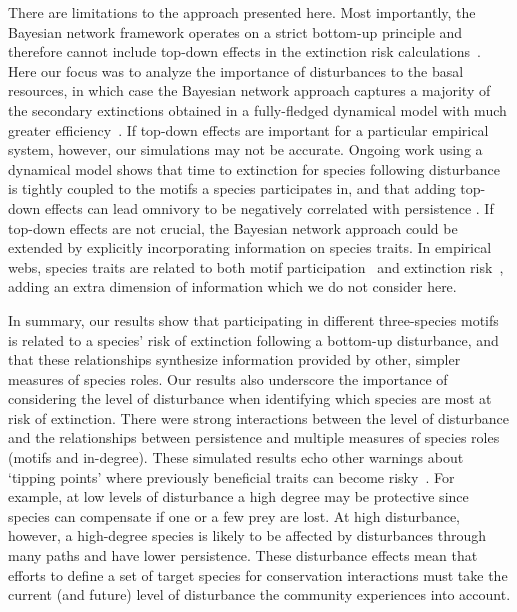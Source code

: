 \documentclass[12pt]{article}
\begin{document}
\begin{spacing}{2.0}
    
    There are limitations to the approach presented here.
    Most importantly, the Bayesian network framework operates on a  strict bottom-up principle and therefore cannot include top-down effects in the extinction risk calculations~\citep{Eklof2013}. 
    Here our focus was to analyze the importance of disturbances to the basal resources, in which case the Bayesian network approach captures a majority of the secondary extinctions obtained in a fully-fledged dynamical model with much greater efficiency~\citep{Eklof2013}.
    If top-down effects are important for a particular empirical system, however, our simulations may not be accurate. 
    Ongoing work using a dynamical model shows that time to extinction for species following disturbance is tightly coupled to the motifs a species participates in, and that adding top-down effects can lead omnivory to be negatively correlated with persistence \citep{Cirtwill2021_inprep}. 
    If top-down effects are not crucial, the Bayesian network approach could be extended by explicitly incorporating information on species traits.
    In empirical webs, species traits are related to both motif participation~\citep{cirtwill2018feeding} and extinction risk~\citep{Brose2017, curtsdotter2011robustness, Cardillo2005, Purvis2000},
    adding an extra dimension of information which we do not consider here.
    
    In summary, our results show that participating in different three-species motifs is related to a species' risk of extinction following a bottom-up disturbance, and that these relationships synthesize information provided by other, simpler measures of species roles.
    Our results also underscore the importance of considering the level of disturbance when identifying which species are most at risk of extinction.
    There were strong interactions between the level of disturbance and the relationships between persistence and multiple measures of species roles (motifs and in-degree).
    These simulated results echo other warnings about `tipping points' where previously beneficial traits can become risky~\citep{Latty2019,Golubski2016,Tylianakis2014}.
    For example, at low levels of disturbance a high degree may be protective since species can compensate if one or a few prey are lost. 
    At high disturbance, however, a high-degree species is likely to be affected by disturbances through many paths and have lower persistence.
    These disturbance effects mean that efforts to define a set of target species for conservation interactions must take the current (and future) level of disturbance the community experiences into account.
    

\end{spacing}
\end{document}
